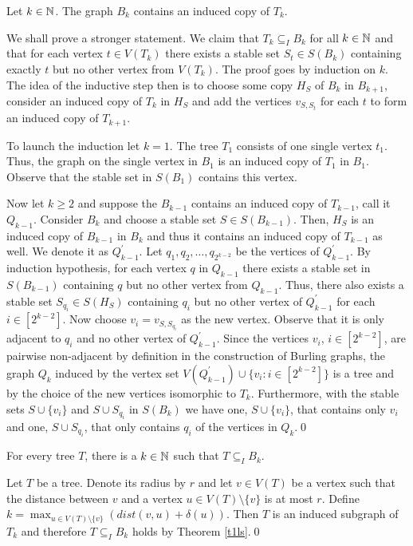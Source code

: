 \begin{thm}\label{t1ls}
Let $k\in\mathbb{N}$. The graph $B_k$ contains an induced copy of $T_k$.
\end{thm}

\begin{prf}
We shall prove a stronger statement. We claim that $T_k\subseteq_I B_k$ for all $k\in\mathbb{N}$ and that for each vertex $t\in V(T_k)$ there exists a stable set $S_t\in S(B_k)$ containing exactly $t$ but no other vertex from $V(T_k)$. The proof goes by induction on $k$. The idea of the inductive step then is to choose some copy $H_S$ of $B_k$ in $B_{k+1}$, consider an induced copy of $T_k$ in $H_S$ and add the vertices $v_{S,S_t}$ for each $t$ to form an induced copy of $T_{k+1}$.

To launch the induction let $k=1$. The tree $T_1$ consists of one single vertex $t_1$. Thus, the graph on the single vertex in $B_1$ is an induced copy of $T_1$ in $B_1$. Observe that the stable set in $S(B_1)$ contains this vertex.

Now let $k\geq 2$ and suppose the $B_{k-1}$ contains an induced copy of $T_{k-1}$, call it $Q_{k-1}$. Consider $B_k$ and choose a stable set $S\in S(B_{k-1})$. Then, $H_S$ is an induced copy of $B_{k-1}$ in $B_k$ and thus it contains an induced copy of $T_{k-1}$ as well. We denote it as $Q_{k-1}^\prime$. Let $q_1, q_2,\dots , q_{2^{k-2}}$ be the vertices of $Q_{k-1}^\prime$. By induction hypothesis, for each vertex $q$ in $Q_{k-1}$ there exists a stable set in $S(B_{k-1})$ containing $q$ but no other vertex from $Q_{k-1}$. Thus, there also exists a stable set $S_{q_i}\in S(H_S)$ containing $q_i$ but no other vertex of $Q_{k-1}^\prime$ for each $i\in [2^{k-2}]$. Now choose $v_i=v_{S,S_{q_i}}$ as the new vertex. Observe that it is only adjacent to $q_i$ and no other vertex of $Q_{k-1}^\prime$. Since the vertices $v_i$, $i\in [2^{k-2}]$, are pairwise non-adjacent by definition in the construction of Burling graphs, the graph $Q_k$ induced by the vertex set $V(Q_{k-1}^\prime)\cup \lbrace v_i:i\in [2^{k-2}]\rbrace$ is a tree and by the choice of the new vertices isomorphic to $T_k$. Furthermore, with the stable sets $S\cup \lbrace v_i\rbrace$ and $S\cup S_{q_i}$ in $S(B_k)$ we have one, $S\cup \lbrace v_i\rbrace$, that contains only $v_i$ and one, $S\cup S_{q_i}$, that only contains $q_i$ of the vertices in $Q_k$.\qed
\end{prf}

\begin{cor}
For every tree $T$, there is a $k\in\mathbb{N}$ such that $T\subseteq_I B_k$.
\end{cor}
\begin{prf}
Let $T$ be a tree. Denote its radius by $r$ and let $v\in V(T)$ be a vertex such that the distance between $v$ and a vertex $u\in V(T)\setminus \lbrace v\rbrace$ is at most $r$. Define $k=\max_{u\in V(T)\setminus \lbrace v\rbrace} (dist(v,u)+\delta (u))$. Then $T$ is an induced subgraph of $T_k$ and therefore $T\subseteq_I B_k$ holds by Theorem \ref{t1ls}.\qed
\end{prf}


